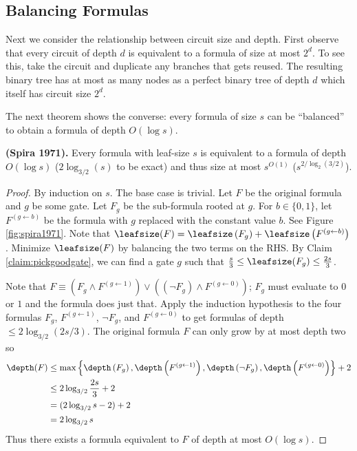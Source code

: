 	\subsection{Balancing Formulas}
	Next we consider the relationship between circuit size and depth. First observe that every circuit of depth $d$ is equivalent to a formula of size  at most $2^d$. To see this, take the circuit and duplicate any branches that gets reused. The resulting binary tree has at most as many nodes as a perfect binary tree of depth $d$ which itself has circuit size $2^d$.   
	
	The next theorem shows the converse: every formula of size $s$ can be ``balanced'' to obtain a formula of depth $O(\log s)$.
	\begin{theorem}
		\textbf{(Spira 1971).} Every formula with leaf-size $s$ is equivalent to a formula of depth $O(\log s)$ ($2\log_{3/2}(s)$ to be exact) and thus size at most $s^{O(1)}$ ($s^{2/\log_2(3/2)}$).
	\end{theorem}
	\begin{proof}
		By induction on $s$. The base case is trivial. Let $F$ be the original formula and $g$ be some gate. Let $F_g$ be the sub-formula rooted at $g$. For $b \in \{0,1\}$, let $F^{(g \leftarrow b)}$ be the formula with $g$ replaced with the constant value $b$. See Figure \ref{fig:spira1971}. Note that $\leafsize(F) = \leafsize\left(F_g\right) + \leafsize\left(F^{\left(g \leftarrow b\right)}\right)$. Minimize $\leafsize(F)$ by balancing the two terms on the RHS. By Claim \ref{claim:pickgoodgate}, we can find a gate $g$ such that $\frac{s}{3} \leq \leafsize(F_g) \leq \frac{2s}{3}$. 
		
		
		Note that $F \equiv \left(F_g \land F^{(g \leftarrow 1)}\right) \lor \left((\lnot F_g) \land F^{(g \leftarrow 0)}\right)$; $F_g$ must evaluate to $0$ or $1$ and the formula does just that. Apply the induction hypothesis to the four formulas $F_g$, $F^{(g \leftarrow 1)}$, $\lnot F_g$, and $F^{(g \leftarrow 0)}$ to get formulas of depth $\leq 2 \log_{3/2}(2s/3)$. The original formula $F$ can only grow by at most depth two so
		\begin{align*}
			\depth(F) &\leq \max\left\{\depth\left(F_g\right), \depth\left(F^{(g \leftarrow 1)}\right), \depth\left(\lnot F_g\right), \depth\left(F^{(g \leftarrow 0)}\right)\right\} + 2\\
			&\leq 2\log_{3/2}\frac{2s}{3} + 2\\ 
			&= (2\log_{3/2}s - 2) + 2\\
			&= 2\log_{3/2}s
		\end{align*} 
		Thus there exists a formula equivalent to $F$ of depth at most $O(\log s)$.
	\end{proof}
	
